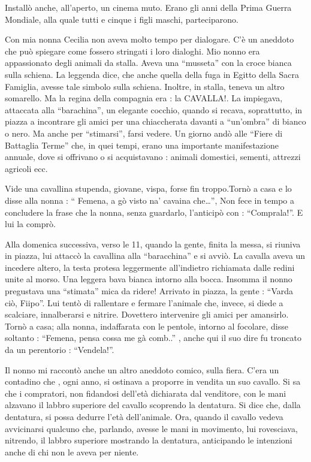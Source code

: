 \documentclass[a4paper,10pt]{book}
\begin{document}
Installò anche, all’aperto, un cinema muto. Erano gli anni della Prima Guerra Mondiale, alla quale tutti e cinque i figli maschi, parteciparono.

Con mia nonna Cecilia non aveva molto tempo per dialogare. C’è un aneddoto che può spiegare come fossero stringati i loro dialoghi.\newline
Mio nonno era appassionato degli animali da stalla. Aveva una “musseta” con la croce bianca sulla schiena. La leggenda dice, che anche quella della fuga in Egitto della Sacra Famiglia, avesse tale simbolo sulla schiena. Inoltre, in stalla, teneva un altro somarello. Ma la regina della compagnia era : la CAVALLA!.\newline
La impiegava, attaccata alla  “barachina”, un elegante cocchio, quando si recava, soprattutto, in piazza a incontrare gli amici per una chiaccherata davanti a “un’ombra” di bianco o nero. Ma anche per “stimarsi”, farsi vedere.\newline
Un giorno andò alle “Fiere di Battaglia Terme” che, in quei tempi, erano una importante manifestazione annuale, dove si offrivano o  si acquistavano : animali domestici, sementi, attrezzi agricoli ecc.

Vide una cavallina stupenda, giovane, vispa, forse fin troppo.Tornò a casa e lo disse alla nonna : “ Femena, a gò visto na’ cavaina che…”, Non fece in tempo a concludere la frase che la nonna, senza guardarlo, l’anticipò con : “Comprala!”. E lui la comprò.

Alla domenica successiva, verso le 11, quando la gente, finita la messa, si riuniva in piazza, lui attaccò la cavallina alla “baracchina” e si avviò. La cavalla aveva un incedere altero, la testa protesa leggermente all’indietro richiamata dalle redini unite al morso. Una leggera bava bianca intorno alla bocca. Insomma il nonno pregustava una “stimata” mica da ridere!\newline
Arrivato in piazza,  la gente : “Varda ciò, Fiipo”.\newline
Lui tentò di rallentare e fermare l’animale che, invece, si diede a scalciare, innalberarsi e nitrire. Dovettero intervenire gli amici per amansirlo.\newline
Tornò a casa; alla nonna, indaffarata con le pentole, intorno al focolare, disse soltanto : “Femena, pensa cossa me gà comb..” , anche qui il suo dire fu troncato da un perentorio : “Vendela!”.

Il nonno mi raccontò anche un altro aneddoto comico, sulla fiera.\newline
C’era un contadino che , ogni anno, si ostinava a proporre in vendita un suo cavallo. Si sa che i compratori, non fidandosi dell’età dichiarata dal venditore,  con le mani alzavano il labbro superiore del cavallo scoprendo la dentatura. Si dice che, dalla dentatura, si possa dedurre l’età dell’animale. Ora, quando il cavallo vedeva avvicinarsi qualcuno che, parlando, avesse le mani in movimento, lui rovesciava, nitrendo, il labbro superiore mostrando la dentatura, anticipando le intenzioni anche di chi non le aveva per niente.
 
\end{document}

